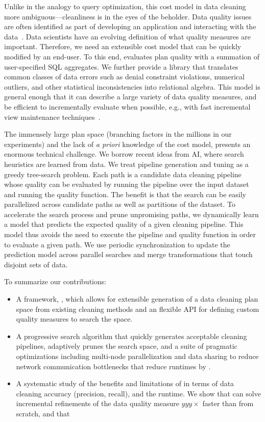 Unlike in the analogy to query optimization, this cost model in data cleaning more ambiguous---cleanliness is in the eyes of the beholder. Data quality issues are often identified as part of developing an application and interacting with the data~\cite{krishnan2016hilda}.  
Data scientists have an evolving definition of what quality measures are important.
Therefore, we need an extensible cost model that can be quickly modified by an end-user.
To this end, \sys evaluates plan quality with a summation of user-specified SQL aggregates.  We further provide a library that translates common classes of data errors such as denial constraint violations, numerical outliers, and other statistical inconsistencies into relational algebra.
This model is general enough that it can describe a large variety of data quality measures, and be efficient to incrementally evaluate when possible, e.g., with fast incremental view maintenance techniques~\cite{DBLP:journals/vldb/KochAKNNLS14,krishnan2015svc}.   

The immensely large plan space (branching factors in the millions in our experiments) and the lack of \emph{a priori} knowledge of the cost model, presents an enormous technical challenge.
We borrow recent ideas from AI, where search heuristics are learned from data.
We treat pipeline generation and tuning as a greedy tree-search problem.   Each path is a candidate data cleaning pipeline whose quality can be evaluated by running the pipeline over the input dataset and running the quality function.  The benefit is that the search can be easily parallelized across candidate paths as well as partitions of the dataset.  To accelerate the search process and prune unpromising paths, we dynamically learn a model that predicts the expected quality of a given cleaning pipeline.  This model thus avoids the need to execute the pipeline and quality function in order to evaluate a given path.  We use periodic synchronization to update the prediction model across parallel searches and merge transformations that touch disjoint sets of data.


\noindent To summarize our contributions:

\begin{itemize}[leftmargin=*, topsep=0mm, itemsep=0mm]
  \item A framework, \sys, which allows for extensible generation of a data cleaning plan space from existing cleaning methods and an flexible API for defining custom quality measures to search the space.
  \item A progressive search algorithm that quickly generates acceptable cleaning pipelines, adaptively prunes the search space, and a suite of pragmatic optimizations including multi-node parallelization and data sharing to reduce network communication bottlenecks that reduce runtimes by .   
  \item A systematic study of the benefits and limitations of \sys in terms of data cleaning accuracy (precision, recall), and the runtime.  We show that \sys can solve incremental refinements of the data quality measure $yyy\times$ faster than from scratch, and that 
\end{itemize}



